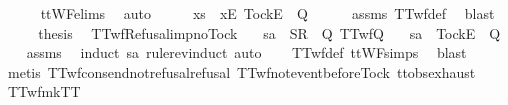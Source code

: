 \ \ \ \ \isamarkupfalse%
\ ttWF{\isachardot}elims{\isacharparenleft}{}{\isacharparenright}\ \isamarkupfalse%
\ auto\isanewline
\ \ \isamarkupfalse%
\ \isamarkupfalse%
\ {\isachardoublequoteopen}xs\ {\isacharat}\ {\isacharbrackleft}{\isacharbrackleft}x{}{\isacharbrackright}\isactrlsub E{\isacharcomma}\ {\isacharbrackleft}Tock{\isacharbrackright}\isactrlsub E{\isacharbrackright}\ {\isasymnotin}\ Q{\isachardoublequoteclose}\isanewline
\ \ \ \ \isamarkupfalse%
\ assms\ TTwf{\isacharunderscore}def\ \isamarkupfalse%
\ blast\isanewline
\ \ \isamarkupfalse%
\ \isamarkupfalse%
\ {\isacharquery}thesis\ \isacommand{{\isachardot}}\isamarkupfalse%
\isanewline
{}\isamarkupfalse%
%
\endisatagproof
{\isafoldproof}%
%
\isadelimproof
\isanewline
%
\endisadelimproof
\isanewline
\isanewline
{}\isamarkupfalse%
\ TTwf{\isacharunderscore}Refusal{\isacharunderscore}imp{\isacharunderscore}no{\isacharunderscore}Tock{\isacharcolon}\isanewline
\ \ \ {\isachardoublequoteopen}sa\ {\isacharat}\ {\isacharbrackleft}{\isacharbrackleft}S{\isacharbrackright}\isactrlsub R{\isacharbrackright}\ {\isasymin}\ Q{\isachardoublequoteclose}\ {\isachardoublequoteopen}TTwf{\isacharparenleft}Q{\isacharparenright}{\isachardoublequoteclose}\isanewline
\ \ \ {\isachardoublequoteopen}sa\ {\isacharat}\ {\isacharbrackleft}{\isacharbrackleft}Tock{\isacharbrackright}\isactrlsub E{\isacharbrackright}\ {\isasymnotin}\ Q{\isachardoublequoteclose}\isanewline
%
\isadelimproof
\ \ %
\endisadelimproof
%
\isatagproof
{}\isamarkupfalse%
\ assms\ \isamarkupfalse%
\ {\isacharparenleft}induct\ sa\ rule{\isacharcolon}rev{\isacharunderscore}induct{\isacharcomma}\ auto{\isacharparenright}\isanewline
\ \ \isamarkupfalse%
\ TTwf{\isacharunderscore}def\ ttWF{\isachardot}simps{\isacharparenleft}{}{\isacharparenright}\ \isamarkupfalse%
\ blast\isanewline
\ \ \isamarkupfalse%
\ {\isacharparenleft}metis\ TTwf{\isacharunderscore}cons{\isacharunderscore}end{\isacharunderscore}not{\isacharunderscore}refusal{\isacharunderscore}refusal\ TTwf{\isacharunderscore}not{\isacharunderscore}event{\isacharunderscore}before{\isacharunderscore}Tock\ ttobs{\isachardot}exhaust{\isacharparenright}%
\endisatagproof
{\isafoldproof}%
%
\isadelimproof
\isanewline
%
\endisadelimproof
\isanewline
{}\isamarkupfalse%
\ TTwf{\isacharunderscore}mkTT{}{\isacharcolon}\isanewline
